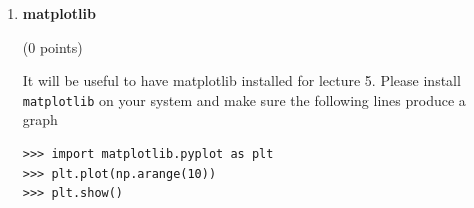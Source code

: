 \documentclass{article}
\newcounter{points}
\newcommand\setpoints[1]{\addtocounter{points}{#1}(#1 points)}
\begin{document}
\begin{enumerate}
\item \textbf{matplotlib} \setpoints{0}

It will be useful to have matplotlib installed for lecture 5. Please install \texttt{matplotlib} on your system and make sure the following lines produce a graph 
\begin{verbatim}
>>> import matplotlib.pyplot as plt
>>> plt.plot(np.arange(10))
>>> plt.show()
\end{verbatim}
\end{enumerate}
\end{document}
